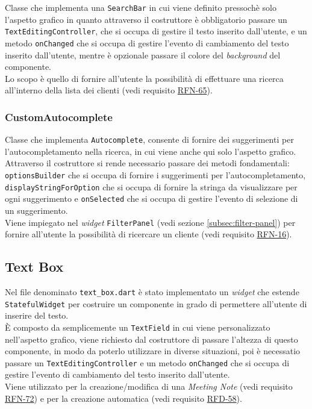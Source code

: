 Classe che implementa una \lstinline{SearchBar}\cite{site:search-bar} in cui viene definito pressochè solo l'aspetto grafico in quanto attraverso il costruttore è obbligatorio passare un \lstinline{TextEditingController}\cite{site:text-editing-controller}, che si occupa di gestire il testo inserito dall'utente, e un metodo \lstinline{onChanged} che si occupa di gestire l'evento di cambiamento del testo inserito dall'utente, mentre è opzionale passare il colore del \emph{background} del componente. \\
Lo scopo è quello di fornire all'utente la possibilità di effettuare una ricerca all'interno della lista dei clienti (vedi requisito \hyperref[RFN-65]{RFN-65}).

\subsubsection*{CustomAutocomplete}
\label{subsubsec:custom-autocomplete}

Classe che implementa \lstinline{Autocomplete}\cite{site:autocomplete}, consente di fornire dei suggerimenti per l'autocompletamento nella ricerca, in cui viene anche qui solo l'aspetto grafico. \\
Attraverso il costruttore si rende necessario passare dei metodi fondamentali: \lstinline{optionsBuilder} che si occupa di fornire i suggerimenti per l'autocompletamento, \lstinline{displayStringForOption} che si occupa di fornire la stringa da visualizzare per ogni suggerimento e \lstinline{onSelected} che si occupa di gestire l'evento di selezione di un suggerimento.\\
Viene impiegato nel \emph{widget} \lstinline{FilterPanel} (vedi sezione \ref{subsec:filter-panel}) per fornire all'utente la possibilità di ricercare un cliente (vedi requisito \hyperref[RFN-16]{RFN-16}).

\subsection{Text Box}
\label{subsec:text-box}

Nel file denominato \lstinline{text_box.dart} è stato implementato un \emph{widget} che estende \lstinline{StatefulWidget} per costruire un componente in grado di permettere all'utente di inserire del testo.\\
È composto da semplicemente un \lstinline{TextField}\cite{site:text-field} in cui viene personalizzato nell'aspetto grafico, viene richiesto dal costruttore di passare l'altezza di questo componente, in modo da poterlo utilizzare in diverse situazioni, poi è necessatio passare un \lstinline{TextEditingController}\cite{site:text-editing-controller} e un metodo \lstinline{onChanged} che si occupa di gestire l'evento di cambiamento del testo inserito dall'utente.\\
Viene utilizzato per la creazione/modifica di una \emph{Meeting Note} (vedi requisito \hyperref[RFN-72]{RFN-72}) e per la creazione automatica (vedi requisito \hyperref[RFD-58]{RFD-58}).

